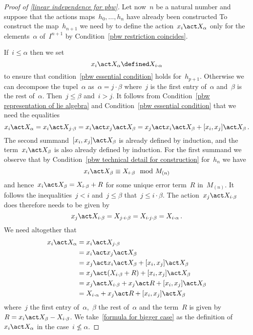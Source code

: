 \begin{proof}[Proof of \cref{linear independence for pbw}]
	Let now~$n$ be a natural number and suppose that the actions maps~$h_0, \dotsc, h_n$ have already been constructed
	To construct the map~$h_{n+1}$ we need by to define the action~$x_i \act X_\alpha$ only for the elements~$\alpha$ of~$I^{n+1}$ by Condition~\ref*{pbw restriction coincides}.
	
	If~$i \leq \alpha$ then we set
	\begin{equation}
		\label{formula for smaller case}
		x_i \act X_\alpha
		\defined
		X_{i \cdot \alpha}
	\end{equation}
	to ensure that condition~\ref{pbw essential condition} holds for~$h_{p+1}$.
	Otherwise we can decompose the tupel~$\alpha$ as~$\alpha = j \cdot \beta$ where~$j$ is the first entry of~$\alpha$ and~$\beta$ is the rest of~$\alpha$.
	Then~$j \leq \beta$ and~$i > j$.
	It follows from Condition~\ref{pbw representation of lie algebra} and Condition~\ref{pbw essential condition} that we need the equalities
	\[
		x_i \act X_\alpha
		=
		x_i \act X_{j \cdot \beta}
		=
		x_i \act x_j \act X_\beta
		=
		x_j \act x_i \act X_\beta + [x_i, x_j] \act X_\beta  \,.
	\]
	The second summand~$[x_i, x_j] \act X_\beta$ is already defined by induction, and the term~$x_i \act X_\beta$ is also already defined by induction.
	For the first summand we observe that by Condition~\ref{pbw technical detail for construction} for~$h_n$ we have
	\[
		x_i \act X_\beta
		\equiv
		X_{i \cdot \beta}
		\mod
		M_{(n)}
	\]
	and hence~$x_i \act X_\beta = X_{i \cdot \beta} + R$ for some unique error term~$R$ in~$M_{(n)}$.
	It follows the inequalities~$j < i$ and~$j \leq \beta$ that~$j \leq i \cdot \beta$.
	The action~$x_j \act X_{i \cdot \beta}$ does therefore needs to be given by
	\[
		x_j \act X_{i \cdot \beta}
		=
		X_{j \cdot i \cdot \beta}
		=
		X_{i \cdot j \cdot \beta}
		=
		X_{i \cdot \alpha}  \,.
	\]
	We need altogether that
	\begin{align}
		x_i \act X_\alpha
		\notag
		&=
		x_i \act X_{j \cdot \beta}
		\notag
		\\
		&=
		x_i \act x_j \act X_\beta
		\notag
		\\
		&=
		x_j \act x_i \act X_\beta + [x_i, x_j] \act X_\beta
		\notag
		\\
		&=
		x_j \act (X_{i \cdot \beta} + R) + [x_i, x_j] \act X_\beta
		\notag
		\\
		&=
		x_j \act X_{i \cdot \beta} + x_j \act R + [x_i, x_j] \act X_\beta
		\notag
		\\
		&=
		X_{i \cdot \alpha} + x_j \act R + [x_i, x_j] \act X_\beta
		\label{formula for bigger case}
	\end{align}
	where~$j$ the first entry of~$\alpha$,~$\beta$ the rest of~$\alpha$ and the term~$R$ is given by~$R = x_i \act X_\beta - X_{i \cdot \beta}$.
	We take~\eqref{formula for bigger case} as the definition of~$x_i \act X_\alpha$ in the case~$i \nleq \alpha$.
	

\end{proof}
